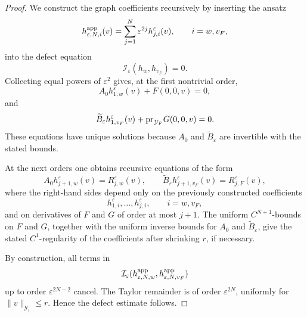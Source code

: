 \documentclass[11pt]{article}
\theoremstyle{definition}
\theoremstyle{remark}
\numberwithin{equation}{section}
\newcommand{\mc}[1]{\mathcal{#1}}
\newcommand{\pr}{\textnormal{pr}}
\begin{document}
\begin{proof}
We construct the graph coefficients recursively by inserting the ansatz
\[
h_{\varepsilon,N,i}^{\rm app}(v)
=
\sum_{j=1}^N\varepsilon^{2j}h_{j,i}^\varepsilon(v),
\qquad
i=w,v_F,
\]
into the defect equation
\[
\mathcal I_\varepsilon(h_w,h_{v_F})=0.
\]
Collecting equal powers of \(\varepsilon^2\) gives, at the first nontrivial
order,
\[
A_0h_{1,w}^\varepsilon(v)+F(0,0,v)=0,
\]
and
\[
\widetilde B_\varepsilon h_{1,v_F}^\varepsilon(v)
+
\pr_{\mc Y_F}G(0,0,v)=0.
\]
These equations have unique solutions because \(A_0\) and
\(\widetilde B_\varepsilon\) are invertible with the stated bounds.

At the next orders one obtains recursive equations of the form
\[
A_0h_{j+1,w}^\varepsilon(v)=R_{j,w}^\varepsilon(v),
\qquad
\widetilde B_\varepsilon h_{j+1,v_F}^\varepsilon(v)
=
R_{j,F}^\varepsilon(v),
\]
where the right-hand sides depend only on the previously constructed
coefficients
\[
h_{1,i}^\varepsilon,\dots,h_{j,i}^\varepsilon,
\qquad i=w,v_F,
\]
and on derivatives of \(F\) and \(G\) of order at most \(j+1\). The uniform
\(C^{N+1}\)-bounds on \(F\) and \(G\), together with the uniform inverse bounds
for \(A_0\) and \(\widetilde B_\varepsilon\), give the stated \(C^1\)-regularity
of the coefficients after shrinking \(r\), if necessary.

By construction, all terms in
\[
\mathcal I_\varepsilon
(h_{\varepsilon,N,w}^{\rm app},
 h_{\varepsilon,N,v_F}^{\rm app})
\]
up to order \(\varepsilon^{2N-2}\) cancel. The Taylor remainder is of order
\(\varepsilon^{2N}\), uniformly for \(\|v\|_{\mc Y_1}\le r\). Hence the
defect estimate follows.


\end{proof}
\end{document}
